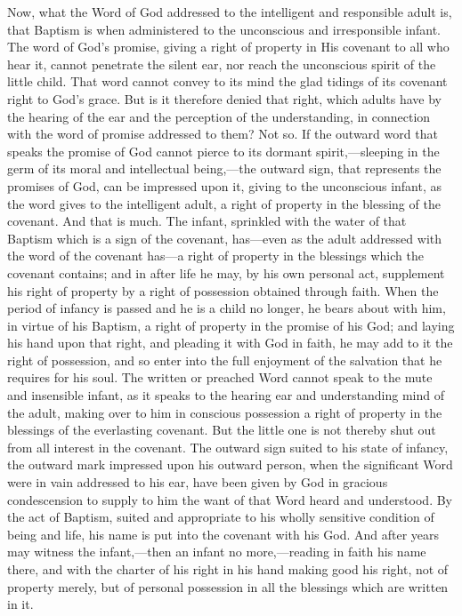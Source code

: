 \documentclass[]{book}
\begin{document}
Now, what the Word of God addressed to the intelligent and responsible adult is, that Baptism is when administered to the unconscious and irresponsible infant. The word of God's promise, giving a right of property in His covenant to all who hear it, cannot penetrate the silent ear, nor reach the unconscious spirit of the little child. That word cannot convey to its mind the glad tidings of its covenant right to God's grace. But is it therefore denied that right, which adults have by the hearing of the ear and the perception of the understanding, in connection with the word of promise addressed to them? Not so. If the outward word that speaks the promise of God cannot pierce to its dormant spirit,---sleeping in the germ of its moral and intellectual being,---the outward sign, that represents the promises of God, can be impressed upon it, giving to the unconscious infant, as the word gives to the intelligent adult, a right of property in the blessing of the covenant. And that is much. The infant, sprinkled with the water of that Baptism which is a sign of the covenant, has---even as the adult addressed with the word of the covenant has---a right of property in the blessings which the covenant contains; and in after life he may, by his own personal act, supplement his right of property by a right of possession obtained through faith. When the period of infancy is passed and he is a child no longer, he bears about with him, in virtue of his Baptism, a right of property in the promise of his God; and laying his hand upon that right, and pleading it with God in faith, he may add to it the right of possession, and so enter into the full enjoyment of the salvation that he requires for his soul. The written or preached Word cannot speak to the mute and insensible infant, as it speaks to the hearing ear and understanding mind of the adult, making over to him in conscious possession a right of property in the blessings of the everlasting covenant. But the little one is not thereby shut out from all interest in the covenant. The outward sign suited to his state of infancy, the outward mark impressed upon his outward person, when the significant Word were in vain addressed to his ear, have been given by God in gracious condescension to supply to him the want of that Word heard and understood. By the act of Baptism, suited and appropriate to his wholly sensitive condition of being and life, his name is put into the covenant with his God. And after years may witness the infant,---then an infant no more,---reading in faith his name there, and with the charter of his right in his hand making good his right, not of property merely, but of personal possession in all the blessings which are written in it.
\end{document}
